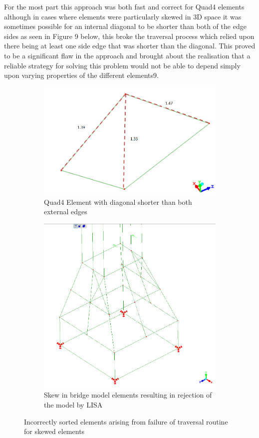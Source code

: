 \noindent
For the most part this approach was both fast and correct for Quad4 elements although in cases where elements were particularly skewed in 3D space it was sometimes possible for an internal diagonal to be shorter than both of the edge sides as seen in Figure 9 below, this broke the traversal process which relied upon there being at least one side edge that was shorter than the diagonal. This proved to be a significant flaw in the approach and brought about the realisation that a reliable strategy for solving this problem would not be able to depend simply upon varying properties of the different elements9. \\ 

\begin{figure}[!h]
\centering
\begin{subfigure}{.5\textwidth}
  \centering
  \includegraphics[width=0.9\linewidth]{../Graphics/SkewedElementIssues.png}
  \caption{Quad4 Element with diagonal shorter than both external edges}
  \label{fig:sub1}
\end{subfigure}%
\begin{subfigure}{.5\textwidth}
  \centering
  \includegraphics[width=0.7\linewidth]{../Graphics/ElementSkewOnBridge.png}
  \caption{Skew in bridge model elements resulting in rejection of the model by LISA}
  \label{fig:sub2}
\end{subfigure}
\caption{Incorrectly sorted elements arising from failure of traversal routine for skewed elements}
\label{fig:test}
\end{figure}



